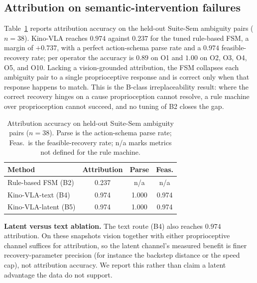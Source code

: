 \documentclass[conference]{IEEEtran}
\newcommand{\kinovla}{Kino-VLA}
\begin{document}
\subsection{Attribution on semantic-intervention failures}
Table~\ref{tab:attribution} reports attribution accuracy on the held-out Suite-Sem
ambiguity pairs ($n=38$). \kinovla{} reaches $0.974$ against $0.237$ for the tuned
rule-based FSM, a margin of $+0.737$, with a perfect action-schema parse rate and a
$0.974$ feasible-recovery rate; per operator the accuracy is $0.89$ on O1 and
$1.00$ on O2, O3, O4, O5, and O10. Lacking a vision-grounded attribution, the FSM
collapses each ambiguity pair to a single proprioceptive response and is correct
only when that response happens to match. This is the B-class irreplaceability
result: where the correct recovery hinges on a cause proprioception cannot resolve,
a rule machine over proprioception cannot succeed, and no tuning of B2 closes the
gap.

\begin{table}[t]
\centering
\caption{Attribution accuracy on held-out Suite-Sem ambiguity pairs ($n=38$).
Parse is the action-schema parse rate; Feas.\ is the feasible-recovery rate; n/a
marks metrics not defined for the rule machine.}
\label{tab:attribution}
\begin{tabular}{lccc}
\toprule
Method & Attribution & Parse & Feas. \\
\midrule
Rule-based FSM (B2)      & 0.237 & n/a   & n/a   \\
\kinovla{}-text (B4)     & 0.974 & 1.000 & 0.974 \\
\kinovla{}-latent (B5)   & 0.974 & 1.000 & 0.974 \\
\bottomrule
\end{tabular}
\end{table}

\textbf{Latent versus text ablation.} The text route (B4) also reaches $0.974$
attribution. On these snapshots vision together with either proprioceptive channel
suffices for attribution, so the latent channel's measured benefit is finer
recovery-parameter precision (for instance the backstep distance or the speed cap),
not attribution accuracy. We report this rather than claim a latent advantage the
data do not support.
\end{document}
